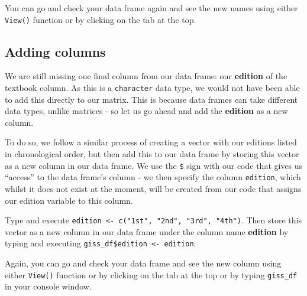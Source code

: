 \documentclass[
]{book}
\newenvironment{Shaded}{\begin{snugshade}}{\end{snugshade}}
\newcommand{\CommentTok}[1]{\textcolor[rgb]{0.56,0.35,0.01}{\textit{#1}}}
\newcommand{\FunctionTok}[1]{\textcolor[rgb]{0.00,0.00,0.00}{#1}}
\newcommand{\NormalTok}[1]{#1}
\newcommand{\OtherTok}[1]{\textcolor[rgb]{0.56,0.35,0.01}{#1}}
\newcommand{\SpecialCharTok}[1]{\textcolor[rgb]{0.00,0.00,0.00}{#1}}
\newcommand{\StringTok}[1]{\textcolor[rgb]{0.31,0.60,0.02}{#1}}
\begin{document}
You can go and check your data frame again and see the new names using either \texttt{View()} function or by clicking on the tab at the top.

\hypertarget{adding-columns}{%
\subsection{Adding columns}\label{adding-columns}}

We are still missing one final column from our data frame: our \textbf{edition} of the textbook column. As this is a \texttt{character} data type, we would not have been able to add this directly to our matrix. This is because data frames can take different data types, unlike matrices - so let us go ahead and add the \textbf{edition} as a new column.

To do so, we follow a similar process of creating a vector with our editions listed in chronological order, but then add this to our data frame by storing this vector as a new column in our data frame. We use the \texttt{\$} sign with our code that gives us ``access'' to the data frame's column - we then specify the column \texttt{edition}, which whilst it does not exist at the moment, will be created from our code that assigns our edition variable to this column.

Type and execute \texttt{edition\ \textless{}-\ c("1st",\ "2nd",\ "3rd",\ "4th")}. Then store this vector as a new column in our data frame under the column name \textbf{edition} by typing and executing \texttt{giss\_df\$edition\ \textless{}-\ edition}:

\begin{Shaded}
\end{Shaded}

Again, you can go and check your data frame and see the new column using either \texttt{View()} function or by clicking on the tab at the top or by typing \texttt{giss\_df} in your console window.
\end{document}
